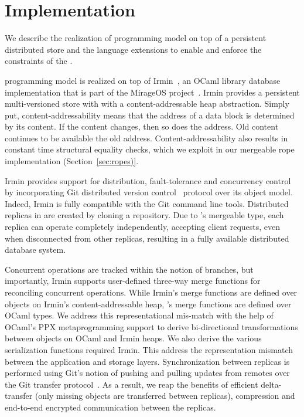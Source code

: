 \section{Implementation}
\label{sec:implementation}

We describe the realization of \name programming model on top of a persistent
distributed store and the language extensions to enable and enforce the
constraints of the \name.

\name programming model is realized on top of Irmin~\cite{irmin}, an OCaml
library database implementation that is part of the MirageOS
project~\cite{mirage}. Irmin provides a persistent multi-versioned store with
with a content-addressable heap abstraction. Simply put, content-addressability
means that the address of a data block is determined by its content. If the
content changes, then so does the address. Old content continues to be
available the old address. Content-addressability also results in constant time
structural equality checks, which we exploit in our mergeable rope
implementation (Section~\ref{sec:ropes)}.

Irmin provides support for distribution, fault-tolerance and concurrency
control by incorporating Git distributed version control~\cite{git} protocol
over its object model. Indeed, Irmin is fully compatible with the Git command
line tools. Distributed replicas in \name are created by cloning a \name
repository. Due to \name's mergeable type, each replica can operate completely
independently, accepting client requests, even when disconnected from other
replicas, resulting in a fully available distributed database system.

Concurrent operations are tracked within the notion of branches, but
importantly, Irmin supports user-defined three-way merge functions for
reconciling concurrent operations. While Irmin's merge functions are defined
over objects on Irmin's content-addressable heap, \name's merge functions are
defined over OCaml types. We address this representational mis-match with the
help of OCaml's PPX metaprogramming support to derive bi-directional
transformations between objects on OCaml and Irmin heaps. We also derive the
various serialization functions required Irmin. This address the representation
mismatch between the application and storage layers. Synchronization between
replicas is performed using Git's notion of pushing and pulling updates from
remotes over the Git transfer protocol~\cite{git-tp}. As a result, we reap the
benefits of efficient delta-transfer (only missing objects are transferred
between replicas), compression and end-to-end encrypted communication between
the replicas.
